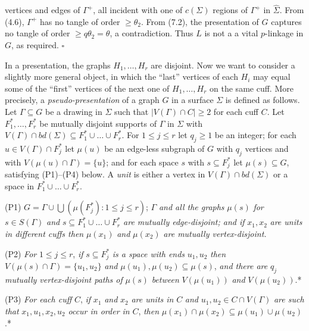 \noindent vertices and edges of $\Gamma^+$, all incident with one of $c(\Sigma)$ regions of $\Gamma^+$ in $\hat{\Sigma}$. From (4.6), $\Gamma^+$ has no tangle of order $\ge \theta_2$. From (7.2), the presentation of $G$ captures no tangle of order $\ge q\theta_2 = \theta$, a contradiction. Thus $L$ is not a a vital $p$-linkage in $G$, as required. $\square$


In a presentation, the graphs $H_1, \dots, H_r$ are disjoint. Now we want to consider a slightly more general object, in which the ``last'' vertices of each $H_i$ may equal some of the ``first'' vertices of the next one of $H_1, \dots, H_r$ on the same cuff. More precisely, a \textit{pseudo-presentation} of a graph $G$ in a surface $\Sigma$ is defined as follows. Let $\Gamma \subseteq G$ be a drawing in $\Sigma$ such that $|V(\Gamma) \cap C| \ge 2$ for each cuff $C$. Let $F_1^*, \dots, F_r^*$ be mutually disjoint supports of $\Gamma$ in $\Sigma$ with $V(\Gamma) \cap bd(\Sigma) \subseteq F_1^* \cup \dots \cup F_r^*$. For $1 \le j \le r$ let $q_j \ge 1$ be an integer; for each $u \in V(\Gamma) \cap F_j^*$ let $\mu(u)$ be an edge-less subgraph of $G$ with $q_j$ vertices and with $V(\mu(u) \cap \Gamma) = \{u\}$; and for each space $s$ with $s \subseteq F_j^*$ let $\mu(s) \subseteq G$, satisfying (P1)--(P4) below. A \textit{unit} is either a vertex in $V(\Gamma) \cap bd(\Sigma)$ or a space in $F_1^* \cup \dots \cup F_r^*$.

\hspace*{12pt}(P1) $G = \Gamma \cup \bigcup(\mu(F_j^*) : 1 \le j \le r)$; $\Gamma$ \textit{and all the graphs} $\mu(s)$ \textit{for} $s \in S(\Gamma)$ \textit{and} $s \subseteq F_1^* \cup \dots \cup F_r^*$ \textit{are mutually edge-disjoint; and if} $x_1, x_2$ \textit{are units in different cuffs then} $\mu(x_1)$ \textit{and} $\mu(x_2)$ \textit{are mutually vertex-disjoint.}

\hspace*{12pt}(P2) \textit{For} $1 \le j \le r$, \textit{if} $s \subseteq F_j^*$ \textit{is a space with ends} $u_1, u_2$ \textit{then} $V(\mu(s) \cap \Gamma) = \{u_1, u_2\}$ \textit{and} $\mu(u_1), \mu(u_2) \subseteq \mu(s)$, \textit{and there are} $q_j$ \textit{mutually vertex-disjoint paths of} $\mu(s)$ \textit{between} $V(\mu(u_1))$ \textit{and} $V(\mu(u_2))$.*

\hspace*{12pt}(P3) \textit{For each cuff} $C$, \textit{if} $x_1$ \textit{and} $x_2$ \textit{are units in} $C$ \textit{and} $u_1, u_2 \in C \cap V(\Gamma)$ \textit{are such that} $x_1, u_1, x_2, u_2$ \textit{occur in order in} $C$, \textit{then} $\mu(x_1) \cap \mu(x_2) \subseteq \mu(u_1) \cup \mu(u_2)$.*

